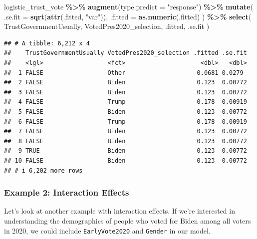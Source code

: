 \documentclass[
]{krantz}
\makeatletter
\newenvironment{Shaded}{\begin{snugshade}}{\end{snugshade}}
\newcommand{\AttributeTok}[1]{\textcolor[rgb]{0.27,0.27,0.27}{#1}}
\newcommand{\FunctionTok}[1]{\textcolor[rgb]{0.27,0.27,0.27}{\textbf{#1}}}
\newcommand{\NormalTok}[1]{#1}
\newcommand{\SpecialCharTok}[1]{\textcolor[rgb]{0.43,0.43,0.43}{\textbf{#1}}}
\newcommand{\StringTok}[1]{\textcolor[rgb]{0.5,0.5,0.5}{#1}}
\newenvironment{kframe}{%
\medskip{}
\setlength{\fboxsep}{.8em}
 \def\at@end@of@kframe{}%
 \ifinner\ifhmode%
  \def\at@end@of@kframe{\end{minipage}}%
  \begin{minipage}{\columnwidth}%
 \fi\fi%
 \def\FrameCommand##1{\hskip\@totalleftmargin \hskip-\fboxsep
 \colorbox{shadecolor}{##1}\hskip-\fboxsep
     \hskip-\linewidth \hskip-\@totalleftmargin \hskip\columnwidth}%
 \MakeFramed {\advance\hsize-\width
   \@totalleftmargin\z@ \linewidth\hsize
   \@setminipage}}%
 {\par\unskip\endMakeFramed%
 \at@end@of@kframe}
\renewenvironment{Shaded}{\begin{kframe}}{\end{kframe}}
\makeatother
\begin{document}
\begin{Shaded}
\begin{Highlighting}[]
\NormalTok{logistic\_trust\_vote }\SpecialCharTok{\%\textgreater{}\%}
  \FunctionTok{augment}\NormalTok{(}\AttributeTok{type.predict =} \StringTok{"response"}\NormalTok{) }\SpecialCharTok{\%\textgreater{}\%}
  \FunctionTok{mutate}\NormalTok{(}
    \AttributeTok{.se.fit =} \FunctionTok{sqrt}\NormalTok{(}\FunctionTok{attr}\NormalTok{(.fitted, }\StringTok{"var"}\NormalTok{)),}
    \AttributeTok{.fitted =} \FunctionTok{as.numeric}\NormalTok{(.fitted)}
\NormalTok{  ) }\SpecialCharTok{\%\textgreater{}\%}
  \FunctionTok{select}\NormalTok{(}
\NormalTok{    TrustGovernmentUsually,}
\NormalTok{    VotedPres2020\_selection,}
\NormalTok{    .fitted,}
\NormalTok{    .se.fit}
\NormalTok{  )}
\end{Highlighting}
\end{Shaded}

\begin{verbatim}
## # A tibble: 6,212 x 4
##    TrustGovernmentUsually VotedPres2020_selection .fitted .se.fit
##    <lgl>                  <fct>                     <dbl>   <dbl>
##  1 FALSE                  Other                    0.0681 0.0279 
##  2 FALSE                  Biden                    0.123  0.00772
##  3 FALSE                  Biden                    0.123  0.00772
##  4 FALSE                  Trump                    0.178  0.00919
##  5 FALSE                  Biden                    0.123  0.00772
##  6 FALSE                  Trump                    0.178  0.00919
##  7 FALSE                  Biden                    0.123  0.00772
##  8 FALSE                  Biden                    0.123  0.00772
##  9 TRUE                   Biden                    0.123  0.00772
## 10 FALSE                  Biden                    0.123  0.00772
## # i 6,202 more rows
\end{verbatim}

\hypertarget{example-2-interaction-effects}{%
\subsubsection*{Example 2: Interaction Effects}\label{example-2-interaction-effects}}


Let's look at another example with interaction effects. If we're interested in understanding the demographics of people who voted for Biden among all voters in 2020, we could include \texttt{EarlyVote2020} and \texttt{Gender} in our model.
\end{document}
